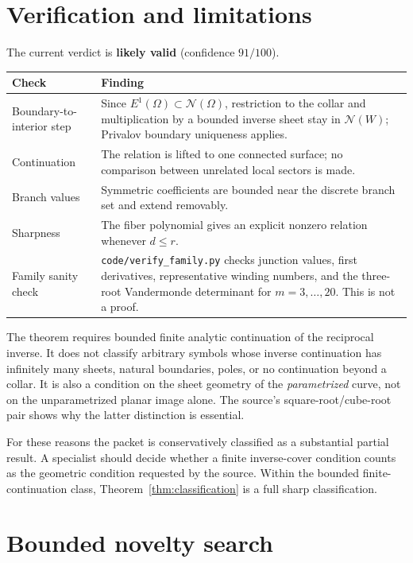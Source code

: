 \documentclass[11pt]{article}
\begin{document}
\section{Verification and limitations}

The current verdict is \textbf{likely valid} (confidence $91/100$).

\begin{center}
\begin{tabular}{p{}p{}}
\toprule
Check & Finding\\
\midrule
Boundary-to-interior step & Since $E^1(\Omega)\subset\mathcal N(\Omega)$,
restriction to the collar and multiplication by a bounded inverse sheet stay
in $\mathcal N(W)$; Privalov boundary uniqueness applies.\\
Continuation & The relation is lifted to one connected surface; no comparison
between unrelated local sectors is made.\\
Branch values & Symmetric coefficients are bounded near the discrete branch
set and extend removably.\\
Sharpness & The fiber polynomial gives an explicit nonzero relation whenever
$d\le r$.\\
Family sanity check & \texttt{code/verify\_family.py} checks junction values,
first derivatives, representative winding numbers, and the three-root
Vandermonde determinant for $m=3,\ldots,20$.  This is not a proof.\\
\bottomrule
\end{tabular}
\end{center}

The theorem requires bounded finite analytic continuation of the reciprocal
inverse.  It does not classify arbitrary symbols whose inverse continuation
has infinitely many sheets, natural boundaries, poles, or no continuation
beyond a collar.  It is also a condition on the sheet geometry of the
\emph{parametrized} curve, not on the unparametrized planar image alone.  The
source's square-root/cube-root pair shows why the latter distinction is
essential.

For these reasons the packet is conservatively classified as a substantial
partial result.  A specialist should decide whether a finite inverse-cover
condition counts as the geometric condition requested by the source.  Within
the bounded finite-continuation class, Theorem~\ref{thm:classification} is a
full sharp classification.

\section{Bounded novelty search}
\end{document}
